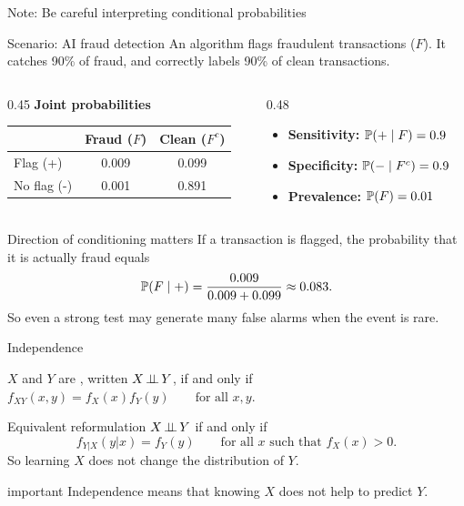 \documentclass[dvipsnames,aspectratio=169,handout]{beamer}
\begin{document}
\begin{frame}{Note: Be careful interpreting conditional probabilities}
\begin{block}{Scenario: AI fraud detection}
An algorithm flags fraudulent transactions ($F$).
It catches 90\% of fraud, and correctly labels 90\% of clean transactions.
\end{block}

\begin{columns}[T]
\begin{column}{0.45\textwidth}
\centering
\textbf{Joint probabilities}\\[1mm]
\begin{tabular}{l|cc}
& Fraud ($F$) & Clean ($F^c$) \\ \hline
Flag (+)    & 0.009 & 0.099 \\
No flag (-) & 0.001 & 0.891
\end{tabular}
\end{column}

\begin{column}{0.48\textwidth}
\begin{itemize}
    \item \textbf{Sensitivity:} $\P(+\mid F)=0.9$
    \item \textbf{Specificity:} $\P(-\mid F^c)=0.9$
    \item \textbf{Prevalence:} $\P(F)=0.01$
\end{itemize}
\end{column}
\end{columns}

\medskip

\begin{alertblock}{Direction of conditioning matters}
If a transaction is flagged, the probability that it is actually fraud equals
\[
\P(F\mid +)=\frac{0.009}{0.009+0.099}\approx 0.083.
\]
So even a strong test may generate many false alarms when the event is rare.
\end{alertblock}
\end{frame}


\begin{frame}{Independence}
\begin{block}{}
$X$ and $Y$ are , written $X\indep Y$, if and only if\\[3mm]
\qquad\qquad\qquad\qquad\qquad$
f_{XY}(x,y)=f_X(x)f_Y(y)
\qquad\mbox{for all }x,y.
$
\end{block}

\begin{alertblock}{Equivalent reformulation}
$X\indep Y$ if and only if
\[
f_{Y|X}(y|x)=f_Y(y)
\qquad\mbox{for all }x\mbox{ such that }f_X(x)>0.
\]
So learning $X$ does not change the distribution of $Y$.
\end{alertblock}

\begin{beamercolorbox}[wd=\textwidth,sep=8pt,center,rounded=true,shadow=true]{important}
Independence means that knowing $X$ does not help to predict $Y$.
\end{beamercolorbox}
\end{frame}
\end{document}
